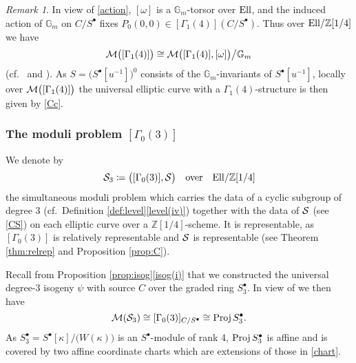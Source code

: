 \documentclass{gtpart}
\theoremstyle{definition}
\theoremstyle{remark}
\newtheorem{rmk}[thm]{Remark}
\newcommand{\mb}[1]{\mathbb{#1}}
\newcommand{\Proj}{{\rm Proj\thinspace}}
\newcommand{\Ell}{{\rm Ell}}
\newcommand{\CM}{{\cal M}}
\newcommand{\CS}{{\cal S}}
\newcommand{\BG}{{\mb G}}
\newcommand{\BZ}{{\mb Z}}
\newcommand{\G}{\Gamma}
\newcommand{\K}{\kappa}
\newcommand{\s}{S^\bullet}
\newcommand{\ce}{\coloneqq}
\newcommand{\isog}[1]{Proposition \ref{prop:isog}\thinspace \eqref{isog(#1)}}
\numberwithin{equation}{section}
\numberwithin{thm}{section}
\begin{document}
\begin{rmk}
\label{rmk:rep}
 In view of \eqref{action}, $[\omega]$ is a $\BG_m$-torsor over $\Ell$, 
 and the induced action of $\BG_m$ on $C/\s$ fixes 
 $P_0(0,0) \in [\G_1(4)](C/\s)$.  Thus over $\Ell/\BZ[1/4]$ we have 
 \[
  \CM \big( [\G_1(4)] \big) 
  \cong \CM \big( [\G_1(4)], [\omega] \big) \big/ \BG_m 
 \]
 (cf.~\cite[7.1.3]{KM} and \cite[Theorem 1.10]{GIT}).  As 
 $S = \big( \s[u^{-1}] \big)^0$ consists of the $\BG_m$-invariants of 
 $\s[u^{-1}]$, locally over $\CM \big( [\G_1(4)] \big)$ the universal 
 elliptic curve with a $\G_1(4)$-structure is then given by \eqref{Cc}.  
\end{rmk}

\subsubsection*{The moduli problem $[\G_0(3)]$}

We denote by 
\[
 \CS_3 \ce \big( [\G_0(3)], \CS \big) \quad \text{over} \quad 
 \Ell/\BZ[1/4] 
\]
the simultaneous moduli problem which carries the data of a cyclic 
subgroup of degree 3 (cf.~Definition 
\ref{def:level}\thinspace \eqref{level(iv)}) together with the data of 
$\CS$ (see \eqref{CS}) on each elliptic curve over a $\BZ[1/4]$-scheme.  
It is representable, as $[\G_0(3)]$ is relatively representable and 
$\CS$ is representable (see Theorem \ref{thm:relrep} and Proposition 
\ref{prop:C}).  

Recall from \isog{i} that we constructed the universal degree-3 isogeny 
$\psi$ with source $C$ over the graded ring $\s_3$.  In view of 
\cite[6.8.7]{KM} we then have 
\[
 \CM(\CS_3) \cong [\G_0(3)]_{C/\s} \cong \Proj \s_3.  
\]
As $\s_3 = \s [\K] \big/ \big( W(\K) \big)$ is an $\s$-module of rank 4, 
$\Proj \s_3$ is affine and is covered by two affine coordinate charts 
which are extensions of those in \eqref{chart}.  
\end{document}
